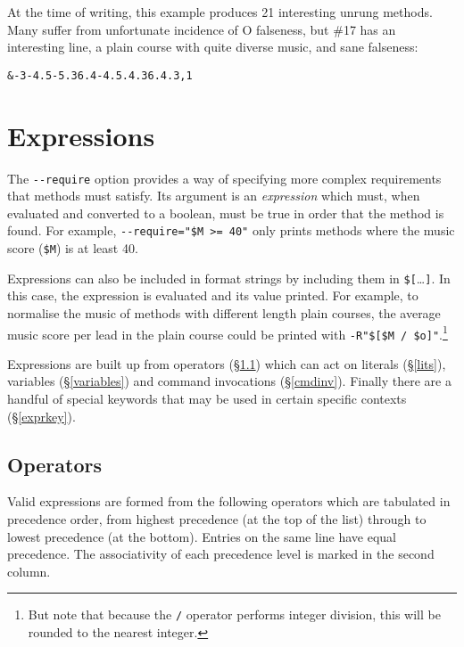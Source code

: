\documentclass[a4paper,11pt,oneside]{book}
\makeatletter
\newcommand{\loi}[1]{\index{#1@{\hspace*{-\loptwidth}\texttt{--#1}}}}
\newcommand{\fspec}[1]{\index{#1@{\hspace*{-\fspecwidth}\texttt{\$#1}}}}
\newcommand{\sref}[1]{\hyperref[#1]{\S\ref{#1}}}
\makeatother
\begin{document}
At the time of writing, this example produces 21 interesting unrung methods.
Many suffer from unfortunate incidence of O falseness, but \#17 has an 
interesting line, a plain course with quite diverse music, and sane falseness:
\begin{Verbatim}
&-3-4.5-5.36.4-4.5.4.36.4.3,1
\end{Verbatim}

\section{Expressions}\label{expr}

The \verb+--require+\loi{require} option provides a way of specifying more 
complex requirements that methods must satisfy.  Its argument is an 
\textit{expression} which must, when evaluated and converted to a boolean, 
must be true in order that the method is found.  For example, 
\verb+--require="$M >= 40"+ only prints methods where the music score 
(\verb+$M+)\fspec{M} is at least 40. 

Expressions can also be included in format strings by including them
in \verb+$[+\ldots\verb+]+.  In this case, the expression is evaluated and
its value printed.  For example, to normalise the music of
methods with different length plain courses, the
average music score per lead in the plain course could be printed with
\verb+-R"$[$M / $o]"+.\footnote{But note that because the \verb+/+ operator
performs integer division, this will be rounded to the nearest integer.}

Expressions are built up from operators (\sref{oper}) which can act 
on literals (\sref{lits}), variables (\sref{variables}) and 
command invocations (\sref{cmdinv}).  Finally there are a handful of 
special keywords that may be used in certain specific contexts 
(\sref{exprkey}).

\subsection{Operators}\label{oper}

Valid expressions are formed from the following operators 
which are tabulated in precedence%
 order, 
from highest precedence (at the top of the list) through to lowest 
precedence (at the bottom).  Entries on the same line have equal precedence.
The associativity%
 of each precedence level 
is marked in the second column.
\end{document}
